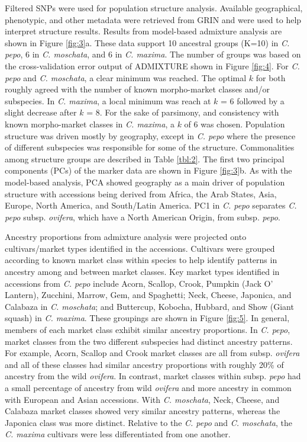 \documentclass[utf8]{FrontiersinHarvard} %
\begin{document}
Filtered SNPs were used for population structure analysis. Available geographical, phenotypic, and other metadata were retrieved from GRIN and were used to help interpret structure results. Results from model-based admixture analysis are shown in Figure \ref{fig:3}a. These data support 10 ancestral groups (K=10) in \textit{C. pepo}, 6 in \textit{C. moschata}, and 6 in \textit{C. maxima}. The number of groups was based on the cross-validation error output of ADMIXTURE shown in Figure \ref{fig:4}. For \textit{C. pepo} and \textit{C. moschata}, a clear minimum was reached. The optimal $k$ for both roughly agreed with the number of known morpho-market classes and/or subspecies. In \textit{C. maxima}, a local minimum was reach at $k$ = 6 followed by a slight decrease after $k$ = 8. For the sake of parsimony, and consistency with known morpho-market classes in \textit{C. maxima}, a $k$ of 6 was chosen.  Population structure was driven mostly by geography, except in \textit{C. pepo} where the presence of different subspecies was responsible for some of the structure. Commonalities among structure groups are described in Table \ref{tbl:2}. The first two principal components (PCs) of the marker data are shown in Figure \ref{fig:3}b. As with the model-based analysis, PCA showed geography as a main driver of population structure with accessions being derived from Africa, the Arab States, Asia, Europe, North America, and South/Latin America. PC1 in \textit{C. pepo} separates \textit{C. pepo} subsp. \textit{ovifera}, which have a North American Origin, from subsp. \textit{pepo}.

Ancestry proportions from admixture analysis were projected onto cultivars/market types identified in the accessions. Cultivars were grouped according to known market class within species to help identify patterns in ancestry among and between market classes. Key market types identified in accessions from \textit{C. pepo} include Acorn, Scallop, Crook, Pumpkin (Jack O’ Lantern), Zucchini, Marrow, Gem, and Spaghetti; Neck, Cheese, Japonica, and Calabaza in \textit{C. moschata}; and Buttercup, Kobocha, Hubbard, and Show (Giant squash) in \textit{C. maxima}. These groupings are shown in Figure \ref{fig:5}. In general, members of each market class exhibit similar ancestry proportions. In \textit{C. pepo}, market classes from the two different subspecies had distinct ancestry patterns. For example, Acorn, Scallop and Crook market classes are all from subsp. \textit{ovifera} and all of these classes had similar ancestry proportions with roughly 20\% of ancestry from the wild \textit{ovifera}. { \color{red}In contrast, market classes within subsp. \textit{pepo} had a small percentage of ancestry from wild \textit{ovifera} and more ancestry in common with European and Asian accessions.} With \textit{C. moschata}, Neck, Cheese, and Calabaza market classes showed very similar ancestry patterns, whereas the Japonica class was more distinct. Relative to the \textit{C. pepo} and \textit{C. moschata}, the \textit{C. maxima} cultivars were less differentiated from one another.
\end{document}
